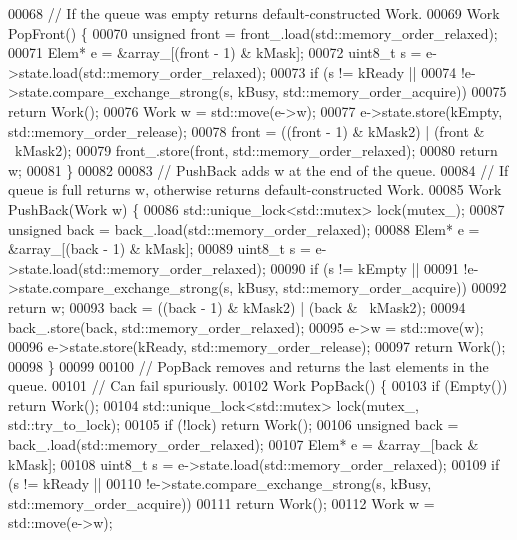 \begin{DoxyCode}
00068   \textcolor{comment}{// If the queue was empty returns default-constructed Work.}
00069   Work PopFront() \{
00070     \textcolor{keywordtype}{unsigned} front = front\_.load(std::memory\_order\_relaxed);
00071     Elem* e = &array\_[(front - 1) & kMask];
00072     uint8\_t s = e->state.load(std::memory\_order\_relaxed);
00073     \textcolor{keywordflow}{if} (s != kReady ||
00074         !e->state.compare\_exchange\_strong(s, kBusy, std::memory\_order\_acquire))
00075       \textcolor{keywordflow}{return} Work();
00076     Work w = std::move(e->w);
00077     e->state.store(kEmpty, std::memory\_order\_release);
00078     front = ((front - 1) & kMask2) | (front & ~kMask2);
00079     front\_.store(front, std::memory\_order\_relaxed);
00080     \textcolor{keywordflow}{return} w;
00081   \}
00082 
00083   \textcolor{comment}{// PushBack adds w at the end of the queue.}
00084   \textcolor{comment}{// If queue is full returns w, otherwise returns default-constructed Work.}
00085   Work PushBack(Work w) \{
00086     std::unique\_lock<std::mutex> lock(mutex\_);
00087     \textcolor{keywordtype}{unsigned} back = back\_.load(std::memory\_order\_relaxed);
00088     Elem* e = &array\_[(back - 1) & kMask];
00089     uint8\_t s = e->state.load(std::memory\_order\_relaxed);
00090     \textcolor{keywordflow}{if} (s != kEmpty ||
00091         !e->state.compare\_exchange\_strong(s, kBusy, std::memory\_order\_acquire))
00092       \textcolor{keywordflow}{return} w;
00093     back = ((back - 1) & kMask2) | (back & ~kMask2);
00094     back\_.store(back, std::memory\_order\_relaxed);
00095     e->w = std::move(w);
00096     e->state.store(kReady, std::memory\_order\_release);
00097     \textcolor{keywordflow}{return} Work();
00098   \}
00099 
00100   \textcolor{comment}{// PopBack removes and returns the last elements in the queue.}
00101   \textcolor{comment}{// Can fail spuriously.}
00102   Work PopBack() \{
00103     \textcolor{keywordflow}{if} (Empty()) \textcolor{keywordflow}{return} Work();
00104     std::unique\_lock<std::mutex> lock(mutex\_, std::try\_to\_lock);
00105     \textcolor{keywordflow}{if} (!lock) \textcolor{keywordflow}{return} Work();
00106     \textcolor{keywordtype}{unsigned} back = back\_.load(std::memory\_order\_relaxed);
00107     Elem* e = &array\_[back & kMask];
00108     uint8\_t s = e->state.load(std::memory\_order\_relaxed);
00109     \textcolor{keywordflow}{if} (s != kReady ||
00110         !e->state.compare\_exchange\_strong(s, kBusy, std::memory\_order\_acquire))
00111       \textcolor{keywordflow}{return} Work();
00112     Work w = std::move(e->w);

\end{DoxyCode}
